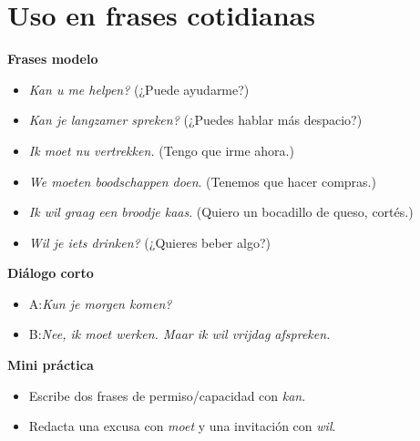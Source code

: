 \section{Uso en frases cotidianas}
\textbf{Frases modelo}
\begin{itemize}[leftmargin=*]
  \item \textit{Kan u me helpen?} (¿Puede ayudarme?)
  \item \textit{Kan je langzamer spreken?} (¿Puedes hablar más despacio?)
  \item \textit{Ik moet nu vertrekken.} (Tengo que irme ahora.)
  \item \textit{We moeten boodschappen doen}. (Tenemos que hacer compras.)
  \item \textit{Ik wil graag een broodje kaas}. (Quiero un bocadillo de queso, cortés.)
  \item \textit{Wil je iets drinken?} (¿Quieres beber algo?)
\end{itemize}

\textbf{Diálogo corto}
\begin{itemize}[leftmargin=*]
  \item A:\@ \textit{Kun je morgen komen?}
  \item B:\@ \textit{Nee, ik moet werken. Maar ik wil vrijdag afspreken.}
\end{itemize}

\textbf{Mini práctica}
\begin{itemize}[leftmargin=*]
  \item Escribe dos frases de permiso/capacidad con \textit{kan}.
  \item Redacta una excusa con \textit{moet} y una invitación con \textit{wil}.
\end{itemize}
